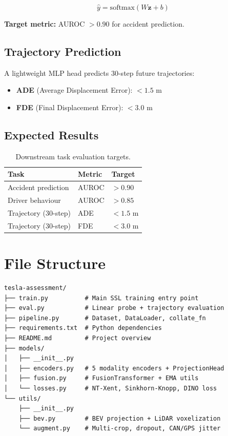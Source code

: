 \documentclass[12pt,a4paper]{article}
\begin{document}
\begin{equation}
    \hat{y} = \text{softmax}(W \mathbf{z} + b)
\end{equation}

\textbf{Target metric:} AUROC $> 0.90$ for accident prediction.

\subsection{Trajectory Prediction}

A lightweight MLP head predicts 30-step future trajectories:

\begin{itemize}[leftmargin=1.5em]
    \item \textbf{ADE} (Average Displacement Error): $< 1.5$ m
    \item \textbf{FDE} (Final Displacement Error): $< 3.0$ m
\end{itemize}

\subsection{Expected Results}

\begin{table}[H]
\centering
\renewcommand{\arraystretch}{1.3}
\begin{tabular}{lll}
\toprule
\textbf{Task} & \textbf{Metric} & \textbf{Target} \\
\midrule
Accident prediction   & AUROC & $>0.90$ \\
Driver behaviour      & AUROC & $>0.85$ \\
Trajectory (30-step)  & ADE   & $<1.5$ m \\
Trajectory (30-step)  & FDE   & $<3.0$ m \\
\bottomrule
\end{tabular}
\caption{Downstream task evaluation targets.}
\end{table}

\section{File Structure}

\begin{lstlisting}[style=pythonstyle, caption={Project directory layout}]
tesla-assessment/
├── train.py          # Main SSL training entry point
├── eval.py           # Linear probe + trajectory evaluation
├── pipeline.py       # Dataset, DataLoader, collate_fn
├── requirements.txt  # Python dependencies
├── README.md         # Project overview
├── models/
│   ├── __init__.py
│   ├── encoders.py   # 5 modality encoders + ProjectionHead
│   ├── fusion.py     # FusionTransformer + EMA utils
│   └── losses.py     # NT-Xent, Sinkhorn-Knopp, DINO loss
└── utils/
    ├── __init__.py
    ├── bev.py        # BEV projection + LiDAR voxelization
    └── augment.py    # Multi-crop, dropout, CAN/GPS jitter
\end{lstlisting}
\end{document}
